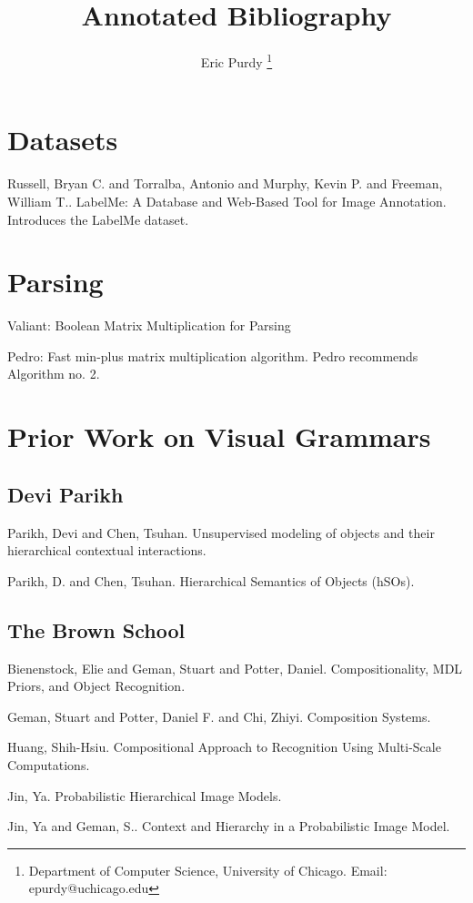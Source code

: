 \documentclass{article}
\title{Annotated Bibliography}
\author{Eric Purdy \footnote{Department of Computer Science, University of Chicago. Email: epurdy@uchicago.edu}}
\begin{document}
\maketitle


\section{ Datasets} 

\bitem
\item Russell, Bryan C. and Torralba, Antonio and Murphy, Kevin P. and Freeman, William T.. {LabelMe}: A Database and Web-Based Tool for Image Annotation. \cite{labelme} 
Introduces the LabelMe dataset.

\eitem

\section{ Parsing} 
Valiant: Boolean Matrix Multiplication for Parsing

Pedro: Fast min-plus matrix multiplication algorithm.
Pedro recommends Algorithm no. 2.

\section{ Prior Work on Visual Grammars} 
\subsection{ Devi Parikh} 

\bitem
\item Parikh, Devi and Chen, Tsuhan. Unsupervised modeling of objects and their hierarchical contextual interactions. \cite{Parikh2009Unsupervised} \item Parikh, D. and Chen, Tsuhan. Hierarchical Semantics of Objects (hSOs). \cite{Parikh2007Hierarchical} 
\eitem

\subsection{ The Brown School} 

\bitem
\item Bienenstock, Elie and Geman, Stuart and Potter, Daniel. Compositionality, MDL Priors, and Object Recognition. \cite{BienenstockCompositionality} \item Geman, Stuart and Potter, Daniel F. and Chi, Zhiyi. Composition Systems. \cite{GemanComposition} \item Huang, Shih-Hsiu. Compositional Approach to Recognition Using Multi-Scale Computations. \cite{Huang2001Compositional} \item Jin, Ya. Probabilistic Hierarchical Image Models. \cite{Jin2006Probabilistic} \item Jin, Ya and Geman, S.. Context and Hierarchy in a Probabilistic Image Model. \cite{jin-geman} 
\eitem
\end{document}
